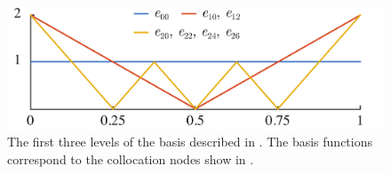 \begin{figure}[t]
  \centering
  \vspace{-1.0em}
  \includegraphics[width=0.9\columnwidth]{include/assets/figures/basis.pdf}
  \vspace{-0.5em}
  \caption{
    The first three levels of the basis described in . The basis
    functions correspond to the collocation nodes show in .
  }
\end{figure}
